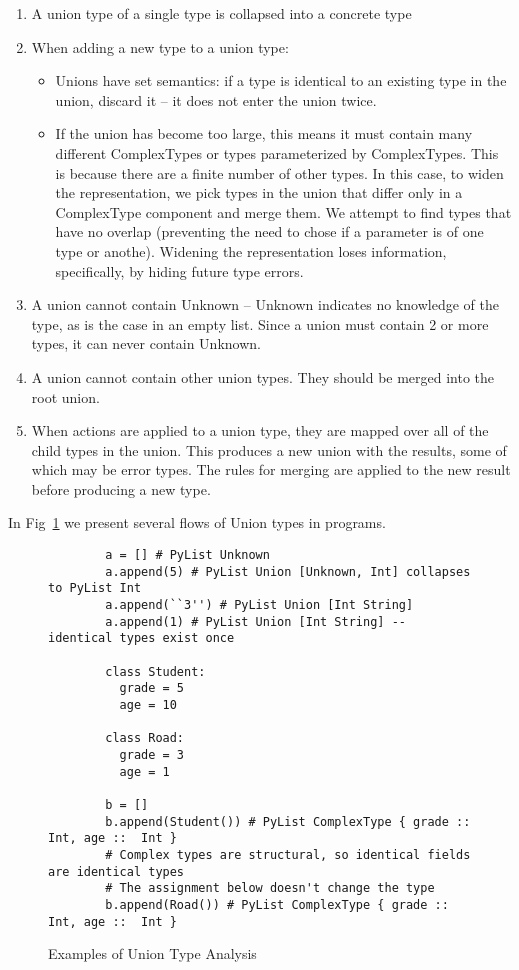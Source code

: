 \documentclass{article}[12pt]
\begin{document}
\begin{enumerate}
  \item A union type of a single type is collapsed into a concrete type
  \item When adding a new type to a union type: 
      \begin{itemize}
          \item Unions have set semantics: if a type is identical to an existing type in the union,
              discard it -- it does
              not enter the union twice.
          \item If the union has become too large, this means it must contain many different
              ComplexTypes or types parameterized by ComplexTypes. This is because there are a
              finite number of other types. In this case, to widen the representation, we pick types
              in the union that differ only in a ComplexType component and merge them. We attempt to
              find types that have no overlap (preventing the need to chose if a parameter is of one
              type or anothe). Widening the representation loses information, specifically, by
              hiding future type errors.
      \end{itemize}
  \item A union cannot contain Unknown -- Unknown indicates no knowledge of the type, as is the case in an empty
              list. Since a union must contain 2 or more types, it can never contain Unknown.
  \item A union cannot contain other union types. They should be merged into the root union.
  \item When actions are applied to a union type, they are mapped over all of the child types in the union. This
      produces a new union with the results, some of which may be error types. The rules for merging are
      applied to the new result before producing a new type.
\end{enumerate}

In Fig~\ref{fig:unionexamples} we present several flows of Union types in programs.
\begin{figure}
    \begin{verbatim}
        a = [] # PyList Unknown
        a.append(5) # PyList Union [Unknown, Int] collapses to PyList Int
        a.append(``3'') # PyList Union [Int String]
        a.append(1) # PyList Union [Int String] -- identical types exist once

        class Student:
          grade = 5
          age = 10

        class Road:
          grade = 3
          age = 1
        
        b = []
        b.append(Student()) # PyList ComplexType { grade :: Int, age ::  Int }
        # Complex types are structural, so identical fields are identical types
        # The assignment below doesn't change the type
        b.append(Road()) # PyList ComplexType { grade :: Int, age ::  Int }
    \end{verbatim}
    \caption{Examples of Union Type Analysis}
    \label{fig:unionexamples}
\end{figure}
\end{document}

